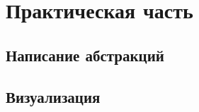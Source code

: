 \newpage
\section{Практическая часть}

\newpage
\subsection{Написание абстракций}

\newpage
\subsection{Визуализация}